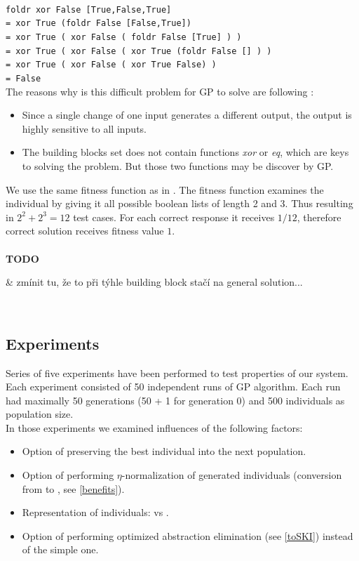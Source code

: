 \documentclass[12pt,a4paper]{report}
\newenvironment{todo}
{ ~\\[0.5em]
  {\color{red}\textbf{TODO}}
  \begin{easylist}[itemize]}
{ \end{easylist}
  ~}
\begin{document}
\texttt{~\\
foldr xor False [True,False,True] \\
= xor True (foldr False [False,True]) \\
= xor True ( xor False ( foldr False [True] ) )\\
= xor True ( xor False ( xor True (foldr False [] ) )\\
= xor True ( xor False ( xor True False) )\\
= False
}\\

The reasons why is this difficult problem 
for GP to solve are following \cite{todo}:

\begin{itemize}
 \item Since a single change of one input generates a different output,
       the output is highly sensitive to all inputs.
 \item The building blocks set does not contain functions \textit{xor}
       or \textit{eq}, which are keys to solving the problem.
       But those two functions may be discover by GP.  
\end{itemize}

We use the same fitness function as in \cite{yu01}. 
The fitness function examines the individual by giving
it all possible boolean lists of length 2 and 3.
Thus resulting in $2^2 + 2^3 = 12$ test cases.
For each correct response it receives $1/12$, 
therefore correct solution receives fitness value $1$.\\

\begin{todo}
 & zmínit tu, že to při týhle building block stačí na general solution...
\end{todo}

\subsection{Experiments}

Series of five experiments have been performed to test properties of our system.
Each experiment consisted of 50 independent runs of GP algorithm.
Each run had maximally 50 generations
(50 + 1 for generation 0) and 500 individuals as population size.\\
 
In those experiments we examined influences of the following factors:

\begin{itemize}
 \item Option of preserving the best individual into the next population.
 \item Option of performing $\eta$-normalization of generated individuals 
      (conversion from \lnf to \benf, see \ref{benefits}).
 \item Representation of individuals: \sexprTree vs \atTree.
 \item Option of performing optimized abstraction elimination
       (see \ref{toSKI}) instead of the simple one.
\end{itemize} 
 
\end{document}
